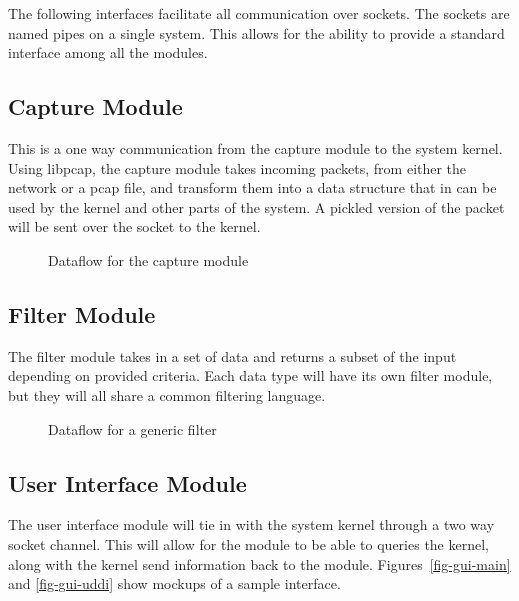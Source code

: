 \documentclass[titlepage]{article}
\begin{document}
The following interfaces facilitate all communication over sockets. The sockets
are named pipes on a single system. This allows for the ability to provide a
standard interface among all the modules.


\subsection{Capture Module
    \label{capture}
}
This is a one way communication from the capture module to the system kernel.
Using libpcap, the capture module takes incoming packets, from either the
network or a pcap file, and transform them into a data structure that in can
be used by the kernel and other parts of the system. A pickled version of the
packet will be sent over the socket to the kernel.

\begin{figure}
    \centering
    \caption{Dataflow for the capture module}
    \label{fig-dataflow-input}
\end{figure}


\subsection{Filter Module
    \label{filter}
}
The filter module takes in a set of data and returns a subset of the input
depending on provided criteria. Each data type will have its own filter module,
but they will all share a common filtering language.

\begin{figure}
    \centering
    \caption{Dataflow for a generic filter}
    \label{fig-dataflow-filter}
\end{figure}


\subsection{User Interface Module
    \label{ui}
}

The user interface module will tie in with the system kernel through a two way
socket channel. This will allow for the module to be able to queries the
kernel, along with the kernel send information back to the module.
Figures~\ref{fig-gui-main} and \ref{fig-gui-uddi} show mockups of a sample
interface.
\end{document}
